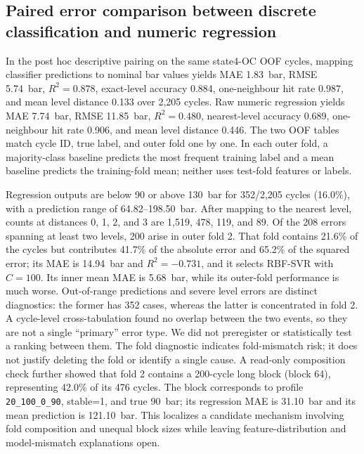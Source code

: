 \documentclass[11pt,a4paper]{article}
\begin{document}
\subsection{Paired error comparison between discrete classification and numeric regression}

In the post hoc descriptive pairing on the same state4-OC OOF cycles, mapping classifier predictions to nominal bar values yields MAE 1.83~bar, RMSE 5.74~bar, $R^2=0.878$, exact-level accuracy 0.884, one-neighbour hit rate 0.987, and mean level distance 0.133 over 2,205 cycles. Raw numeric regression yields MAE 7.74~bar, RMSE 11.85~bar, $R^2=0.480$, nearest-level accuracy 0.689, one-neighbour hit rate 0.906, and mean level distance 0.446. The two OOF tables match cycle ID, true label, and outer fold one by one. In each outer fold, a majority-class baseline predicts the most frequent training label and a mean baseline predicts the training-fold mean; neither uses test-fold features or labels.

Regression outputs are below 90 or above 130~bar for 352/2,205 cycles (16.0\%), with a prediction range of 64.82--198.50~bar. After mapping to the nearest level, counts at distances 0, 1, 2, and 3 are 1,519, 478, 119, and 89. Of the 208 errors spanning at least two levels, 200 arise in outer fold 2. That fold contains 21.6\% of the cycles but contributes 41.7\% of the absolute error and 65.2\% of the squared error; its MAE is 14.94~bar and $R^2=-0.731$, and it selects RBF-SVR with $C=100$. Its inner mean MAE is 5.68~bar, while its outer-fold performance is much worse. Out-of-range predictions and severe level errors are distinct diagnostics: the former has 352 cases, whereas the latter is concentrated in fold 2. A cycle-level cross-tabulation found no overlap between the two events, so they are not a single ``primary'' error type. We did not preregister or statistically test a ranking between them. The fold diagnostic indicates fold-mismatch risk; it does not justify deleting the fold or identify a single cause. A read-only composition check further showed that fold 2 contains a 200-cycle long block (block 64), representing 42.0\% of its 476 cycles. The block corresponds to profile \texttt{20\_100\_0\_90}, stable=1, and true 90~bar; its regression MAE is 31.10~bar and its mean prediction is 121.10~bar. This localizes a candidate mechanism involving fold composition and unequal block sizes while leaving feature-distribution and model-mismatch explanations open.
\end{document}
